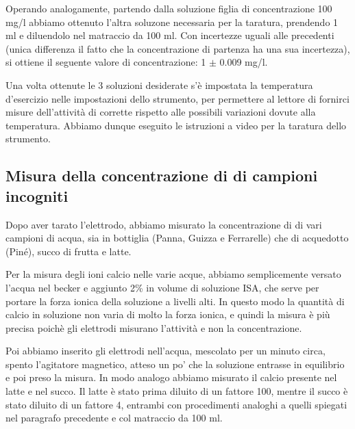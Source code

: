 Operando analogamente, partendo dalla soluzione figlia di concentrazione 100 mg/l abbiamo ottenuto l'altra soluzone
necessaria per la taratura, prendendo 1 ml e diluendolo nel matraccio da 100 ml. Con incertezze uguali alle precedenti (unica differenza il fatto che la concentrazione di partenza ha una sua incertezza), si ottiene il seguente
valore di concentrazione: 1 $\pm$ 0.009 mg/l.

Una volta ottenute le 3 soluzioni desiderate s'è impostata la temperatura d'esercizio nelle impostazioni
dello strumento, per permettere al lettore di fornirci misure dell'attività di 
corrette rispetto alle possibili variazioni dovute alla temperatura. Abbiamo dunque eseguito le istruzioni a video
per la taratura dello strumento.

\subsection*{Misura della concentrazione di  di campioni incogniti}

Dopo aver tarato l'elettrodo, abbiamo misurato la concentrazione di  di vari campioni di acqua,
sia in bottiglia (Panna, Guizza e Ferrarelle) che di acquedotto (Piné), succo di frutta e latte.

Per la misura degli ioni calcio nelle varie acque, abbiamo semplicemente versato l'acqua nel becker
e aggiunto 2\% in volume di soluzione ISA, che serve per portare la forza ionica della soluzione
a livelli alti. In questo modo la quantità di calcio in soluzione non varia di molto la forza ionica,
e quindi la misura è più precisa poichè gli elettrodi misurano l'attività e non la concentrazione.

Poi abbiamo inserito gli elettrodi nell'acqua, mescolato per un minuto circa, spento l'agitatore magnetico,
atteso un po' che la soluzione entrasse in equilibrio e poi preso la misura. In modo analogo abbiamo
misurato il calcio presente nel latte e nel succo. Il latte è stato prima diluito di un fattore 100,
mentre il succo è stato diluito di un fattore 4, entrambi con procedimenti analoghi a quelli spiegati nel paragrafo
precedente e col matraccio da 100 ml.
